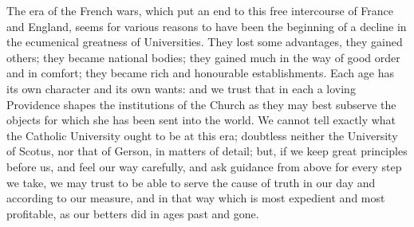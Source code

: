 The era of the French wars,
which put an end to this free intercourse of France and England, seems
for various reasons to have been the beginning of a decline in the
ecumenical greatness of Universities. They lost some advantages, they
gained others; they became national bodies; they gained much in the
way of good order and in comfort; they became rich and honourable
establishments. Each age has its own character and its own wants: and
we trust that in each a loving Providence shapes the institutions of
the Church as they may best subserve the objects for which she has
been sent into the world. We cannot tell exactly what the Catholic
University ought to be at this era; doubtless neither the University of Scotus, nor that of Gerson, in matters of detail; but,
if we keep great principles before us, and feel our way carefully, and
ask guidance from above for every step we take, we may trust to be
able to serve the cause of truth in our day and according to our
measure, and in that way which is most expedient and most profitable,
as our betters did in ages past and gone.


